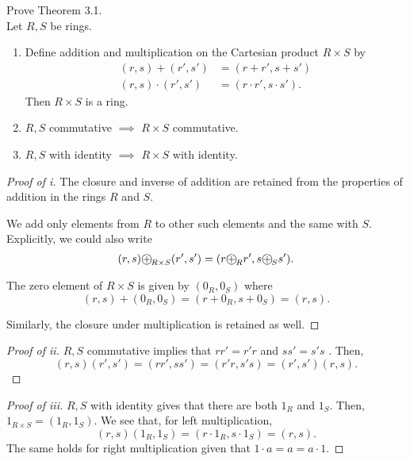 \documentclass[../hw3]{subfiles}
\begin{document}
\begin{problem}
Prove Theorem 3.1. \\
Let $R,S$ be rings.
\begin{enumerate}[label=\roman*)]
	\item Define addition and multiplication on the Cartesian product  $R\times S$ by
	      \begin{align*}
		      (r,s)+(r',s')      & = (r + r', s + s')         \\
		      (r,s)\cdot (r',s') & = (r \cdot r', s \cdot s')
		      .\end{align*}
	      Then $R\times S$ is a ring.

	\item  $R,S$ commutative  $\implies$ $R\times S$ commutative.
	\item  $R,S$ with identity  $\implies$ $R\times S$ with identity.
\end{enumerate}\end{problem}
\begin{proof}[Proof of i]
	The closure and inverse of addition are retained from the properties of addition in the rings $R$ and $S$.

	We add only elements from $R$ to other such elements and the same with $S$.
	Explicitly, we could also write \[
		(r,s) {\bigcirc\mkern-16mu+}_{R\times S}(r',s') = (r {\bigcirc\mkern-16mu+}_R r', s {\bigcirc\mkern-16mu+}_S s')
		.\]

	The zero element of  $R\times S$ is given by $(0_R,0_S)$ where  \[
		(r,s)+(0_R,0_S)=(r+0_R,s+0_S)=(r,s)
		.\]

	Similarly, the closure under multiplication is retained as well.
\end{proof}
\begin{proof}[Proof of ii]
	$R,S$ commutative implies that $rr'=r'r$ and $ss' = s's$ .
	Then, \[
		(r,s)(r',s')=(rr',ss')=(r'r,s's)=(r',s')(r,s)
		.\]
\end{proof}
\begin{proof}[Proof of iii]
	$R,S$ with identity gives that there are both $1_R$ and  $1_S$.
	Then,  $1_{R\times S} = (1_R,1_S)$.
	We see that, for left multiplication, \[
		(r,s)(1_R,1_S)=(r\cdot 1_R,s\cdot 1_S)=(r,s)
		.\]
	The same holds for right multiplication given that $1\cdot a = a = a\cdot 1$.

\end{proof}
\end{document}
